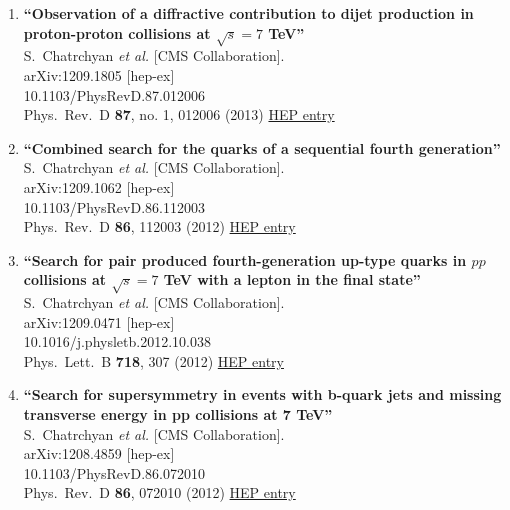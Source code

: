 \documentclass{article}
\begin{document}
\begin{enumerate}
\item%
{\bf ``Observation of a diffractive contribution to dijet production in proton-proton collisions at $\sqrt{s}=7$ TeV''}
  \\{}S.~Chatrchyan {\it et al.} [CMS Collaboration].
  \\{}arXiv:1209.1805 [hep-ex]
    \\{}10.1103/PhysRevD.87.012006
\\{}Phys.\ Rev.\ D {\bf 87}, no. 1, 012006 (2013) %
\href{http://inspirehep.net/record/1184941}{HEP entry}


\item%
{\bf ``Combined search for the quarks of a sequential fourth generation''}
  \\{}S.~Chatrchyan {\it et al.} [CMS Collaboration].
  \\{}arXiv:1209.1062 [hep-ex]
    \\{}10.1103/PhysRevD.86.112003
\\{}Phys.\ Rev.\ D {\bf 86}, 112003 (2012) %
\href{http://inspirehep.net/record/1184487}{HEP entry}


\item%
{\bf ``Search for pair produced fourth-generation up-type quarks in $pp$ collisions at $\sqrt{s}=7$ TeV with a lepton in the final state''}
  \\{}S.~Chatrchyan {\it et al.} [CMS Collaboration].
  \\{}arXiv:1209.0471 [hep-ex]
    \\{}10.1016/j.physletb.2012.10.038
\\{}Phys.\ Lett.\ B {\bf 718}, 307 (2012) %
\href{http://inspirehep.net/record/1184341}{HEP entry}


\item%
{\bf ``Search for supersymmetry in events with b-quark jets and missing transverse energy in pp collisions at 7 TeV''}
  \\{}S.~Chatrchyan {\it et al.} [CMS Collaboration].
  \\{}arXiv:1208.4859 [hep-ex]
    \\{}10.1103/PhysRevD.86.072010
\\{}Phys.\ Rev.\ D {\bf 86}, 072010 (2012) %
\href{http://inspirehep.net/record/1181767}{HEP entry}



\end{enumerate}
\end{document}
